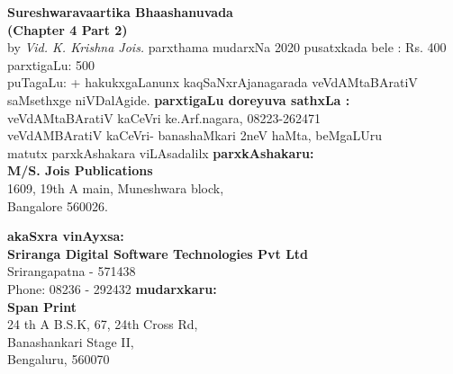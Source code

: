 \thispagestyle{empty}
\begin{flushleft}
{\rm{\textbf{Sureshwaravaartika Bhaashanuvada \\ (Chapter 4 Part 2)}\\by \textit{Vid. K. Krishna Jois.}}}
\vfill
parxthama mudarxNa {\rm {2020}}
\vfill
pusatxkada bele : {\rm {Rs. 400}}\\
parxtigaLu: {\rm {500}}\\
puTagaLu: {\rm\pageref{prelims:end}+\pageref{book:end}}
\vfill
hakukxgaLanunx kaqSaNxrAjanagarada veVdAMtaBAratiV saMsethxge niVDalAgide. 
\vfill
\textbf{parxtigaLu doreyuva sathxLa :}\\
veVdAMtaBAratiV kaCeVri ke.Arf.nagara, {\rm 08223-262471}\\
veVdAMBAratiV kaCeVri- banashaMkari 2neV haMta, beMgaLUru\\
matutx parxkAshakara viLAsadalilx
\vfill
\textbf{parxkAshakaru:}\\
{\rm {\textbf{M/S. Jois Publications} \\
1609, 19th A main, Muneshwara block,\\
Bangalore 560026.}}

\vfill
\textbf{akaSxra vinAyxsa:}\\ {\rm{\textbf{Sriranga Digital Software Technologies Pvt Ltd}\\ Srirangapatna - 571438\\ Phone: 08236 - 292432}}
\vfill
\textbf{mudarxkaru:}\\ {\rm{\textbf{Span Print}\\ 24 th A B.S.K, 67, 24th Cross Rd,\\ Banashankari Stage II,\\ Bengaluru, 560070}}

\end{flushleft}
